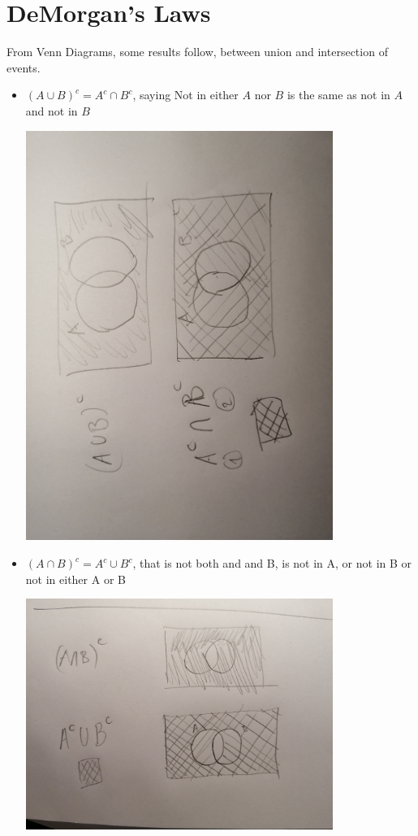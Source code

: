 \documentclass[11pt]{book}
\begin{document}

\section{DeMorgan's Laws}%
\label{sec:demorgan_s_laws}

From Venn Diagrams, some results follow, between union and intersection of events.

\begin{itemize}
    \item $\left( A\cup B \right) ^{c} = A^{c} \cap B^{c} $, saying Not in either $A$ nor $B$ is the same as not in $A$ and not in $B$ 
        \begin{center}
            \includegraphics[width=100mm]{assets/dml1.jpg} 
        \end{center}
    \item $\left( A\cap B \right)^{c} = A^{c} \cup B^{c} $, that is not both and and B, is not in A, or not in B or not in either A or B
        \begin{center}
            \includegraphics[width=100mm]{assets/dml2.jpg} 

\end{center}
\end{itemize}
\end{document}
